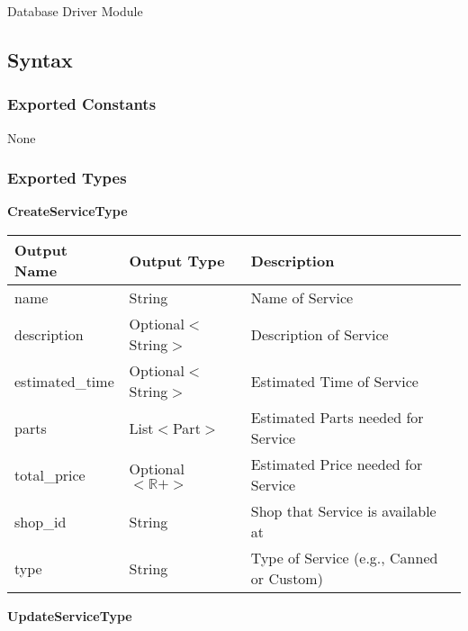 \documentclass[12pt, titlepage]{article}
\begin{document}
Database Driver Module

\subsection{Syntax}

\subsubsection{Exported Constants}

None

\subsubsection{Exported Types}

\textbf{CreateServiceType}

\begin{table}[H]
	\begin{tabular}{|p{}|p{}|p{}|}
		\hline
		\textbf{Output Name} & \textbf{Output Type}    & \textbf{Description}                     \\
		\hline
		name                 & String                  & Name of Service                          \\
		\hline
		description          & Optional$<$String$>$    & Description of Service                   \\
		\hline
		estimated\_time      & Optional$<$String$>$    & Estimated Time of Service                \\
		\hline
		parts                & List$<$Part$>$          & Estimated Parts needed for Service       \\
		\hline
		total\_price         & Optional$<\mathbb{R}+>$ & Estimated Price needed for Service       \\
		\hline
		shop\_id             & String                  & Shop that Service is available at        \\
		\hline
		type                 & String                  & Type of Service (e.g., Canned or Custom) \\
		\hline
	\end{tabular}
\end{table}

\textbf{UpdateServiceType}
\end{document}

